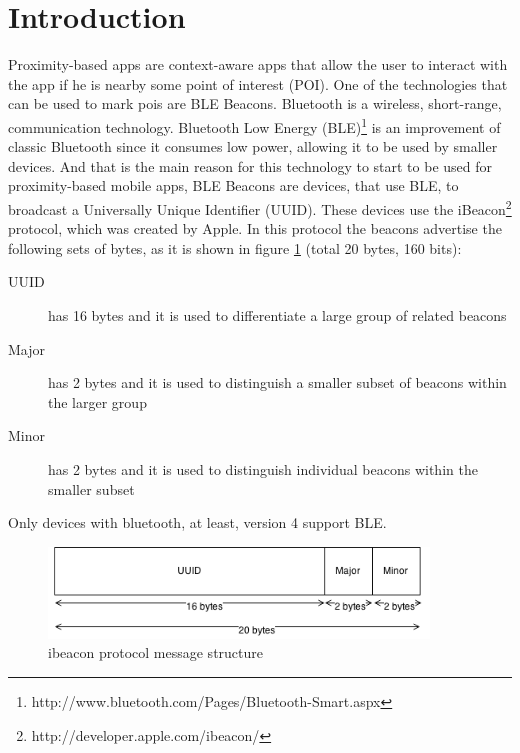 
\section{Introduction}
\label{sec:introduction}
Proximity-based apps are
context-aware apps that allow the user to interact
with the app if he is nearby some point of interest (POI).
One of the technologies that can be used to mark pois are BLE Beacons.
Bluetooth is a wireless, short-range, communication technology.
Bluetooth Low Energy (BLE)\footnote{http://www.bluetooth.com/Pages/Bluetooth-Smart.aspx}
\cite{ble}
is an improvement of classic Bluetooth since it consumes
low power, allowing it to be used by smaller devices.
And that is the main reason for this technology to start to
be used for proximity-based mobile apps,
BLE Beacons are devices, that use BLE, to broadcast a
Universally Unique Identifier (UUID).
These devices use the
iBeacon\footnote{http://developer.apple.com/ibeacon/}
protocol, which was created
by Apple\texttrademark. In this protocol the beacons
advertise the following sets of bytes, as it is shown in
figure \ref{fig:ibeacon}
(total 20 bytes, 160 bits):
\begin{description}
  \item[UUID] has 16 bytes and it is used to differentiate a
  large group of related beacons
  \item[Major] has 2 bytes and it is used to distinguish a smaller
  subset of beacons within the larger group
  \item[Minor] has 2 bytes and it is used to distinguish individual
  beacons within the smaller subset
\end{description}
Only devices with bluetooth, at least, version 4 support BLE.

\begin{figure}[!ht]
  \centering
    \includegraphics[width=0.9\textwidth]{figures/ibeacon}
    \caption{ibeacon protocol message structure}
    \label{fig:ibeacon}
\end{figure}



